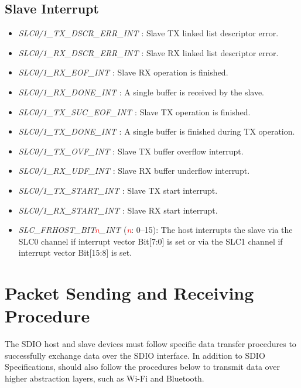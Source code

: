 \documentclass[main\_\_EN.tex]{subfiles}
\begin{document}
\subsection{Slave Interrupt}
\begin{itemize}
\item {\it SLC0/1\_TX\_DSCR\_ERR\_INT \label{int:SLC01TXDSCRERRINT}}: Slave TX linked list descriptor error.
\item {\it SLC0/1\_RX\_DSCR\_ERR\_INT \label{int:SLC01RXDSCRERRINT}}: Slave RX linked list descriptor error.
\item {\it SLC0/1\_RX\_EOF\_INT \label{int:SLC01RXEOFINT}}: Slave RX operation is finished.
\item {\it SLC0/1\_RX\_DONE\_INT \label{int:SLC01RXDONEINT}}: A single buffer is received by the slave.
\item {\it SLC0/1\_TX\_SUC\_EOF\_INT \label{int:SLC01TXSUCEOFINT}}: Slave TX operation is finished.
\item {\it SLC0/1\_TX\_DONE\_INT \label{int:SLC01TXDONEINT}}: A single buffer is finished during TX operation.
\item {\it SLC0/1\_TX\_OVF\_INT \label{int:SLC01TXOVFINT}}: Slave TX buffer overflow interrupt.
\item {\it SLC0/1\_RX\_UDF\_INT \label{int:SLC01RXUDFINT}}: Slave RX buffer underflow interrupt.
\item {\it SLC0/1\_TX\_START\_INT \label{int:SLC01TXSTARTINT}}: Slave TX start interrupt.
\item {\it SLC0/1\_RX\_START\_INT \label{int:SLC01RXSTARTINT}}: Slave RX start interrupt.
\item {\it SLC\_FRHOST\_BIT\textcolor{red}{\it{n}}\_INT \label{int:SLCFRHOSTBITnINT}} (\textcolor{red}{\it{n}}: 0–15): The host interrupts the slave via the SLC0 channel if interrupt vector Bit[7:0] is set or via the SLC1 channel if interrupt vector Bit[15:8] is set.
\end{itemize}

\section{Packet Sending and Receiving Procedure}

The SDIO host and slave devices must follow specific data transfer procedures to successfully exchange data over the SDIO interface. In addition to SDIO Specifications, \chipname{} should also follow the procedures below to transmit data over higher abstraction layers, such as Wi-Fi and Bluetooth.
\end{document}
